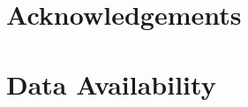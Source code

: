 \documentclass[fleqn,usenatbib]{mnras}
\begin{document}
\section*{Acknowledgements}

\section*{Data Availability}





\bsp
\label{lastpage}
\end{document}

